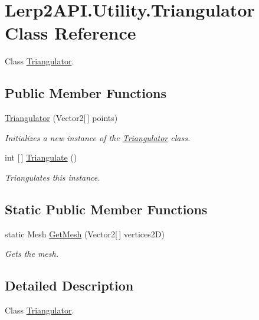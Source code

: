 \hypertarget{class_lerp2_a_p_i_1_1_utility_1_1_triangulator}{}\section{Lerp2\+A\+P\+I.\+Utility.\+Triangulator Class Reference}
\label{class_lerp2_a_p_i_1_1_utility_1_1_triangulator}


Class \hyperlink{class_lerp2_a_p_i_1_1_utility_1_1_triangulator}{Triangulator}.  


\subsection*{Public Member Functions}
\begin{DoxyCompactItemize}
\item 
\hyperlink{class_lerp2_a_p_i_1_1_utility_1_1_triangulator_ac9456e6e7b64cb7755e9d543508bb1b0}{Triangulator} (Vector2\mbox{[}$\,$\mbox{]} points)
\begin{DoxyCompactList}\small\item\em Initializes a new instance of the \hyperlink{class_lerp2_a_p_i_1_1_utility_1_1_triangulator}{Triangulator} class. \end{DoxyCompactList}\item 
int \mbox{[}$\,$\mbox{]} \hyperlink{class_lerp2_a_p_i_1_1_utility_1_1_triangulator_a88b04de93434765b8d2326f1bd180a08}{Triangulate} ()
\begin{DoxyCompactList}\small\item\em Triangulates this instance. \end{DoxyCompactList}\end{DoxyCompactItemize}
\subsection*{Static Public Member Functions}
\begin{DoxyCompactItemize}
\item 
static Mesh \hyperlink{class_lerp2_a_p_i_1_1_utility_1_1_triangulator_a26d50740cfb15d2532c7f44878b72218}{Get\+Mesh} (Vector2\mbox{[}$\,$\mbox{]} vertices2D)
\begin{DoxyCompactList}\small\item\em Gets the mesh. \end{DoxyCompactList}\end{DoxyCompactItemize}


\subsection{Detailed Description}
Class \hyperlink{class_lerp2_a_p_i_1_1_utility_1_1_triangulator}{Triangulator}. 



